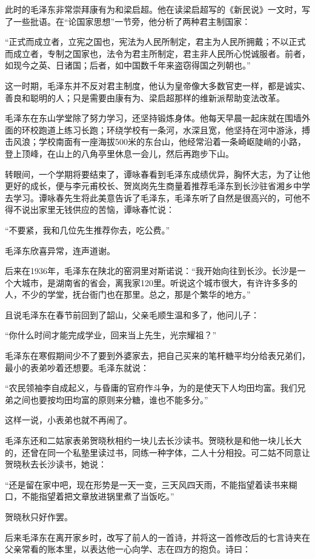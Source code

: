 \documentclass[../../dazhuan.tex]{subfiles}
\begin{document}
此时的毛泽东非常崇拜康有为和梁启超。他在读梁启超写的《新民说》一文时，写了一些批语。在“论国家思想”一节旁，他分析了两种君主制国家：

“正式而成立者，立宪之国也，宪法为人民所制定，君主为人民所拥戴；不以正式而成立者，专制之国家也，法令为君主所制定，君主非人民所心悦诚服者。前者，如现今之英、日诸国；后者，如中国数千年来盗窃得国之列朝也。”

这一时期，毛泽东并不反对君主制度，他认为皇帝像大多数官吏一样，都是诚实、善良和聪明的人；只是需要由康有为、梁启超那样的维新派帮助变法改革。

毛泽东在东山学堂除了努力学习，还坚持锻炼身体。他每天早晨一起床就在围墙外面的环校跑道上练习长跑；环绕学校有一条河，水深且宽，他坚持在河中游泳，搏击风浪；学校南面有一座海拔500米的东台山，他经常沿着一条崎岖陡峭的小路，登上顶峰，在山上的八角亭里休息一会儿，然后再跑步下山。

转眼间，一个学期将要结束了，谭咏春看到毛泽东成绩优异，胸怀大志，为了让他更好的成长，便与李元甫校长、贺岚岗先生商量着推荐毛泽东到长沙驻省湘乡中学去学习。谭咏春先生将此美意告诉了毛泽东，毛泽东听了自然是很高兴的，可他不得不说出家里无钱供应的苦恼，谭咏春忙说：

“不要紧，我和几位先生推荐你去，吃公费。”

毛泽东欣喜异常，连声道谢。

后来在1936年，毛泽东在陕北的窑洞里对斯诺说：“我开始向往到长沙。长沙是一个大城市，是湖南省的省会，离我家120里。听说这个城市很大，有许许多多的人，不少的学堂，抚台衙门也在那里。总之，那是个繁华的地方。”

且说毛泽东在春节前回到了韶山，父亲毛顺生温和多了，他问儿子：

“你什么时间才能完成学业，回来当上先生，光宗耀祖？”

毛泽东在寒假期间少不了要到外婆家去，把自己买来的笔杆糖平均分给表兄弟们，最小的表弟吵着还想要。毛泽东就说：

“农民领袖李自成起义，与昏庸的官府作斗争，为的是使天下人均田均富。我们兄弟之间也要按均田均富的原则来分糖，谁也不能多分。”

这样一说，小表弟也就不再闹了。

毛泽东还和二姑家表弟贺晓秋相约一块儿去长沙读书。贺晓秋是和他一块儿长大的，还曾在同一个私塾里读过书，同练一种字体，二人十分相投。可二姑不同意让贺晓秋去长沙读书，她说：

“还是留在家中吧，现在形势是一天一变，三天风四天雨，不能指望着读书来糊口，不能指望着把文章放进锅里煮了当饭吃。”

贺晓秋只好作罢。

后来毛泽东在离开家乡时，改写了前人的一首诗，并将这一首修改后的七言诗夹在父亲常看的账本里，以表达他一心向学、志在四方的抱负。诗曰：
\end{document}
